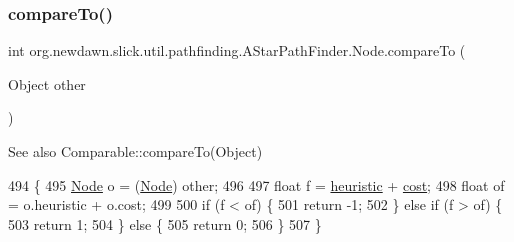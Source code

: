 \subsubsection{\texorpdfstring{compare\+To()}{compareTo()}}
{\footnotesize\ttfamily int org.\+newdawn.\+slick.\+util.\+pathfinding.\+A\+Star\+Path\+Finder.\+Node.\+compare\+To (\begin{DoxyParamCaption}\item[{Object}]{other }\end{DoxyParamCaption})\hspace{0.3cm}{\ttfamily [inline]}}

\begin{DoxySeeAlso}{See also}
Comparable\+::compare\+To(\+Object) 
\end{DoxySeeAlso}

\begin{DoxyCode}
494                                            \{
495             \mbox{\hyperlink{classorg_1_1newdawn_1_1slick_1_1util_1_1pathfinding_1_1_a_star_path_finder_1_1_node_a4829984840f278579c342740b1cece78}{Node}} o = (\mbox{\hyperlink{classorg_1_1newdawn_1_1slick_1_1util_1_1pathfinding_1_1_a_star_path_finder_1_1_node_a4829984840f278579c342740b1cece78}{Node}}) other;
496             
497             \textcolor{keywordtype}{float} f = \mbox{\hyperlink{classorg_1_1newdawn_1_1slick_1_1util_1_1pathfinding_1_1_a_star_path_finder_1_1_node_aef05c5122f0a6a57b7daf3115b31bc3a}{heuristic}} + \mbox{\hyperlink{classorg_1_1newdawn_1_1slick_1_1util_1_1pathfinding_1_1_a_star_path_finder_1_1_node_afdb3132e5a155cb259db862e0a1ec018}{cost}};
498             \textcolor{keywordtype}{float} of = o.heuristic + o.cost;
499             
500             \textcolor{keywordflow}{if} (f < of) \{
501                 \textcolor{keywordflow}{return} -1;
502             \} \textcolor{keywordflow}{else} \textcolor{keywordflow}{if} (f > of) \{
503                 \textcolor{keywordflow}{return} 1;
504             \} \textcolor{keywordflow}{else} \{
505                 \textcolor{keywordflow}{return} 0;
506             \}
507         \}
\end{DoxyCode}
\mbox{\label{classorg_1_1newdawn_1_1slick_1_1util_1_1pathfinding_1_1_a_star_path_finder_1_1_node_aa13fd11da922c5dfdbe8738eb536125d}} 
